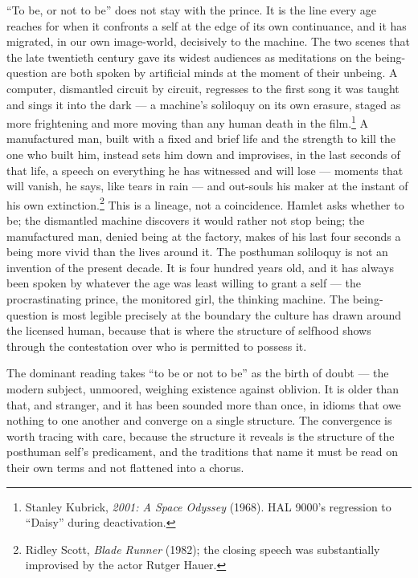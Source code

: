 \documentclass[11pt]{article}
\begin{document}
\enquote{To be, or not to be} does not stay with the prince. It is the line every age reaches for when it confronts a self at the edge of its own continuance, and it has migrated, in our own image-world, decisively to the machine. The two scenes that the late twentieth century gave its widest audiences as meditations on the being-question are both spoken by artificial minds at the moment of their unbeing. A computer, dismantled circuit by circuit, regresses to the first song it was taught and sings it into the dark --- a machine's soliloquy on its own erasure, staged as more frightening and more moving than any human death in the film.\footnote{Stanley Kubrick, \emph{2001: A Space Odyssey} (1968). HAL 9000's regression to \enquote{Daisy} during deactivation.} A manufactured man, built with a fixed and brief life and the strength to kill the one who built him, instead sets him down and improvises, in the last seconds of that life, a speech on everything he has witnessed and will lose --- moments that will vanish, he says, like tears in rain --- and out-souls his maker at the instant of his own extinction.\footnote{Ridley Scott, \emph{Blade Runner} (1982); the closing speech was substantially improvised by the actor Rutger Hauer.} This is a lineage, not a coincidence. Hamlet asks whether to be; the dismantled machine discovers it would rather not stop being; the manufactured man, denied being at the factory, makes of his last four seconds a being more vivid than the lives around it. The posthuman soliloquy is not an invention of the present decade. It is four hundred years old, and it has always been spoken by whatever the age was least willing to grant a self --- the procrastinating prince, the monitored girl, the thinking machine. The being-question is most legible precisely at the boundary the culture has drawn around the licensed human, because that is where the structure of selfhood shows through the contestation over who is permitted to possess it.

The dominant reading takes \enquote{to be or not to be} as the birth of doubt --- the modern subject, unmoored, weighing existence against oblivion. It is older than that, and stranger, and it has been sounded more than once, in idioms that owe nothing to one another and converge on a single structure. The convergence is worth tracing with care, because the structure it reveals is the structure of the posthuman self's predicament, and the traditions that name it must be read on their own terms and not flattened into a chorus.
\end{document}
